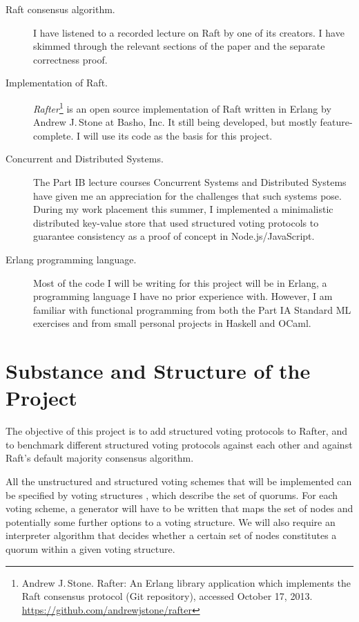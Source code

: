\documentclass[12pt]{scrartcl}
\begin{document}
\begin{description}

\item[Raft consensus algorithm.] I have listened to a recorded lecture on Raft by one of its creators. I have skimmed through the relevant sections of the paper and the separate correctness proof.

\item[Implementation of Raft.] \emph{Rafter}\footnote{Andrew J.\,Stone. Rafter: An Erlang library application which implements the Raft consensus protocol (Git repository), accessed October 17, 2013. \url{https://github.com/andrewjstone/rafter}} is an open source implementation of Raft written in Erlang by Andrew J.\,Stone at Basho, Inc. It still being developed, but mostly feature-complete. I will use its code as the basis for this project.

\item[Concurrent and Distributed Systems.] The Part IB lecture courses Concurrent Systems and Distributed Systems have given me an appreciation for the challenges that such systems pose. During my work placement this summer, I implemented a minimalistic distributed key-value store that used structured voting protocols to guarantee consistency as a proof of concept in Node.js/JavaScript.

\item[Erlang programming language.] Most of the code I will be writing for this project will be in Erlang, a programming language I have no prior experience with. However, I am familiar with functional programming from both the Part IA Standard ML exercises and from small personal projects in Haskell and OCaml.

\end{description}


\section{Substance and Structure of the Project%
  \label{substance-and-structure-of-the-project}%
}

The objective of this project is to add structured voting protocols to Rafter, and to benchmark different structured voting protocols against each other and against Raft's default majority consensus algorithm.

All the unstructured and structured voting schemes that will be implemented can be specified by voting structures \cite{voting}, which describe the set of quorums. For each voting scheme, a generator will have to be written that maps the set of nodes and potentially some further options to a voting structure. We will also require an interpreter algorithm that decides whether a certain set of nodes constitutes a quorum within a given voting structure.
\end{document}
